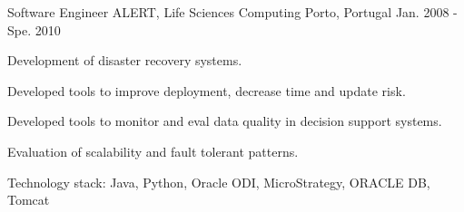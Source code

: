 \begin{cventries}
  \cventry
  {Software Engineer} %
  {ALERT, Life Sciences Computing} %
  {Porto, Portugal} %
  {Jan. 2008 - Spe. 2010} %
  {
    \begin{cvitems} %
      \item {Development of disaster recovery systems.}
      \item {Developed tools to improve deployment, decrease time and update risk.}
      \item {Developed tools to monitor and eval data quality in decision support systems.}
      \item {Evaluation of scalability and fault tolerant patterns.}
      \item {Technology stack: Java, Python, Oracle ODI, MicroStrategy, ORACLE DB, Tomcat}
    \end{cvitems}
  }

\end{cventries}

